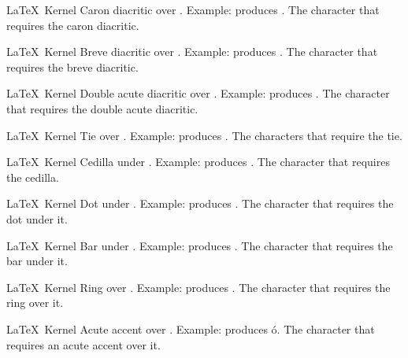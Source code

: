%
 {}%
 {\LaTeX\ Kernel}%
 {Caron diacritic over . Example: 
   produces \ocaron.}%
 {%
   \BeginArgList
     The character that requires the caron
      diacritic.
   \EndArgList
 }

%
 {}%
 {\LaTeX\ Kernel}%
 {Breve diacritic over . Example: 
   produces \obreve.%
 }%
 {%
   \BeginArgList
     The character that requires the breve
      diacritic.
   \EndArgList
 }

%
 {}%
 {\LaTeX\ Kernel}%
 {Double acute diacritic over . Example: 
   produces \odoubleacute.%
 }%
 {%
   \BeginArgList
     The character that requires the double
      acute diacritic.
   \EndArgList
 }

%
 {}%
 {\LaTeX\ Kernel}%
 {Tie over . Example: 
   produces \xytie.%
 }%
 {%
   \BeginArgList
     The characters that require the tie.
   \EndArgList
 }

%
 {}%
 {\LaTeX\ Kernel}%
 {Cedilla under . Example: 
   produces \ocedilla.%
 }%
 {%
   \BeginArgList
     The character that requires the cedilla.
   \EndArgList
 }

%
 {}%
 {\LaTeX\ Kernel}%
 {Dot under . Example: 
   produces \odotunder.%
 }%
 {%
   \BeginArgList
     The character that requires the dot
     under it.
   \EndArgList
 }

%
 {}%
 {\LaTeX\ Kernel}%
 {Bar under . Example: 
   produces \rbarunder.%
 }%
 {%
   \BeginArgList
     The character that requires the bar
     under it.
   \EndArgList
 }

%
 {}%
 {\LaTeX\ Kernel}%
 {Ring over . Example: 
   produces \uring.%
 }%
 {%
   \BeginArgList
     The character that requires the ring
      over it.
   \EndArgList
 }

%
 {}%
 {\LaTeX\ Kernel}%
 {Acute accent over . Example:
    produces \protect\'{o}.%
 }%
 {%
   \BeginArgList
     The character that requires an acute
     accent over it.
   \EndArgList
 }

